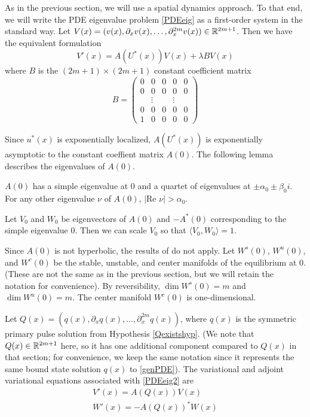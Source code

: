 \documentclass[thesis.tex]{subfiles}
\begin{document}
As in the previous section, we will use a spatial dynamics approach. To that end, we will write the PDE eigenvalue problem \eqref{PDEeig} as a first-order system in the standard way. Let $V(x) = (v(x), \partial_x v(x), \dots, \partial_x^{2m}v(x)) \in {\mathbb R}^{2m+1}$. Then we have the equivalent formulation
\begin{equation}\label{PDEeig2}
V'(x) = A(U^*(x))V(x) + \lambda B V(x)
\end{equation}
where $B$ is the $(2m+1) \times (2m+1)$ constant coefficient matrix
\begin{equation}\label{DefB}
B = \begin{pmatrix}0 & 0 & 0 & 0 & 0 \\0 & 0 & 0 & 0 & 0 \\  & 
\vdots & & \vdots & \\0 & 0 & 0 & 0 & 0 \\1 & 0 & 0 & 0 & 0 \end{pmatrix} 
\end{equation}

Since $u^*(x)$ is exponentially localized, $A(U^*(x))$ is exponentially asymptotic to the constant coeffient matrix $A(0)$. The following lemma describes the eigenvalues of $A(0)$.

\begin{lemma}\label{eigA0lemma}
$A(0)$ has a simple eigenvalue at 0 and a quartet of eigenvalues at $\pm \alpha_0 \pm \beta_0 i$. For any other eigenvalue $\nu$ of $A(0)$, $|\text{Re }\nu| > \alpha_0$.

Let $V_0$ and $W_0$ be eigenvectors of $A(0)$ and $-A^*(0)$ corresponding to the simple eigenvalue 0. Then we can scale $V_0$ so that $\langle V_0, W_0 \rangle = 1$. 
\end{lemma}

Since $A(0)$ is not hyperbolic, the results of \cite{Sandstede1998} do not apply. Let $W^s(0)$, $W^u(0)$, and $W^c(0)$ be the stable, unstable, and center manifolds of the equilibrium at 0. (These are not the same as in the previous section, but we will retain the notation for convenience). By reversibility, $\dim W^s(0) = m$ and $\dim W^u(0) = m$. The center manifold $W^c(0)$ is one-dimensional.

Let $Q(x) = (q(x), \partial_x q(x), \dots, \partial_x^{2m} q(x))$, where $q(x)$ is the symmetric primary pulse solution from Hypothesis \ref{Qexistshyp}. (We note that $Q(x) \in {\mathbb R}^{2m+1}$ here, so it has one additional component compared to $Q(x)$ in that section; for convenience, we keep the same notation since it represents the same bound state solution $q(x)$ to \eqref{genPDE}). The variational and adjoint variational equations associated with \eqref{PDEeig2} are
\begin{align}
V'(x) = A(Q(x)) V(x) \label{vareq2} \\
W'(x) = -A(Q(x))^* W(x) \label{adjvareq2}
\end{align}
\end{document}
